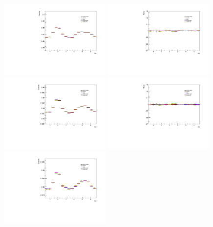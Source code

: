 \begin{figure}[ht]
    \centering
    \includegraphics[width=0.49\textwidth]{figures/analysis/sideband_variations_dphi_0_20_lowpt.pdf}
    \includegraphics[width=0.49\textwidth]{figures/analysis/sideband_variations_dphi_0_20_lowpt_ratio.pdf}
    \includegraphics[width=0.49\textwidth]{figures/analysis/sideband_variations_dphi_20_50_lowpt.pdf}
    \includegraphics[width=0.49\textwidth]{figures/analysis/sideband_variations_dphi_20_50_lowpt_ratio.pdf}
    \includegraphics[width=0.49\textwidth]{figures/analysis/sideband_variations_dphi_50_80_lowpt.pdf}

\end{figure}

